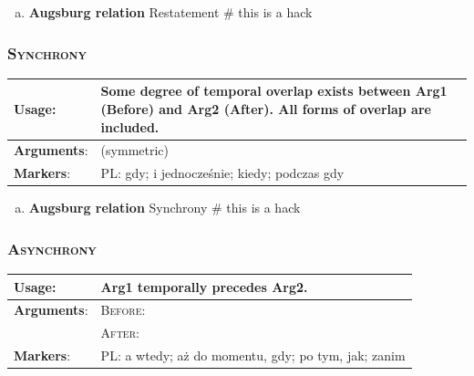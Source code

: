 \documentclass{udisc}
\begin{document}
\begin{enumerate}[a)]
\item \textbf{Augsburg relation} Restatement
\nonstopmode # this is a hack
\end{enumerate}
\errorstopmode




\subsubsection{\textsc{Synchrony}}

\begin{tabularx}{\textwidth}{|l|L|}
\hline

\textbf{Usage}:           &  Some degree of temporal overlap exists between Arg1 (Before) and Arg2 (After). All forms of overlap are included. \\
\hline

\textbf{Arguments}:       &  (symmetric) \\
\hline

\textbf{Markers}:        &  PL: gdy; i jednocześnie; kiedy; podczas gdy \\
\hline

\end{tabularx}

\begin{enumerate}[a)]
\item \textbf{Augsburg relation} Synchrony
\nonstopmode # this is a hack
\end{enumerate}
\errorstopmode




\subsubsection{\textsc{Asynchrony}}

\begin{tabularx}{\textwidth}{|l|L|}
\hline

\textbf{Usage}:           &  Arg1 temporally precedes Arg2. \\
\hline

\textbf{Arguments}:       &  \textsc{Before}:  \\
                          &  \textsc{After}:  \\
\hline

\textbf{Markers}:        &  PL: a wtedy; aż do momentu, gdy; po tym, jak; zanim \\
\hline

\end{tabularx}
\end{document}

